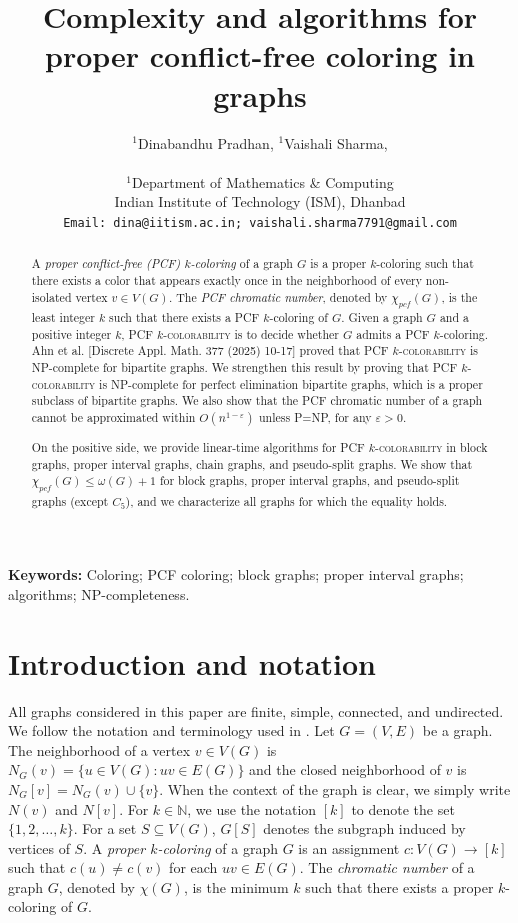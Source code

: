\documentclass[11pt]{article}
\title{Complexity and algorithms for proper conflict-free coloring in graphs}
\author{$^1$Dinabandhu Pradhan, $^1$Vaishali Sharma, \\ \\
	$^{1}$Department of Mathematics \& Computing\\ Indian Institute of Technology (ISM), Dhanbad\\
	\small \tt Email: dina@iitism.ac.in; vaishali.sharma7791@gmail.com}
\theoremstyle{plain}
\begin{document}
	
	
	\maketitle
	\begin{abstract}
		A \emph{proper conflict-free (PCF) $k$-coloring} of a graph $G$ is a proper $k$-coloring such that there exists a color that appears exactly once in the neighborhood of every non-isolated vertex $v\in V(G)$.
		The \emph{PCF chromatic number}, denoted by $\chi_{pcf}(G)$, is the least integer $k$ such that there exists a PCF $k$-coloring of $G$. Given a graph $G$ and a positive integer $k$, PCF $k$-\textsc{colorability} is to decide whether $G$ admits a PCF $k$-coloring. Ahn et al. [Discrete Appl. Math. 377 (2025) 10-17] proved that PCF $k$-\textsc{colorability} is NP-complete for bipartite graphs. We strengthen this result by proving that PCF $k$-\textsc{colorability} is NP-complete for perfect elimination bipartite graphs, which is a proper subclass of bipartite graphs. We also show that the PCF chromatic number of a graph cannot be approximated within $O(n^{1-\varepsilon})$ unless P=NP, for any $\varepsilon>0$. 
		
		\medskip
		On the positive side, we provide linear-time algorithms for PCF $k$-\textsc{colorability} in block graphs, proper interval graphs, chain graphs, and pseudo-split graphs. We show that $\chi_{pcf}(G)\leq \omega(G)+1$ for block graphs, proper interval graphs, and pseudo-split graphs (except $C_5$), and we characterize all graphs for which the equality holds.
		
	\end{abstract}
	
	\bigskip
	\noindent\textbf{Keywords:}
	Coloring; PCF coloring; block graphs; proper interval graphs;  algorithms; NP-completeness.
	
	
	
	
	
	\section{Introduction and notation}
	
	All graphs considered in this paper are finite, simple, connected, and undirected. We follow the notation and terminology used in \cite{textBook}. Let $G=(V,E)$ be a graph. The neighborhood of a vertex $v\in V(G)$ is $N_G(v)=\{u\in V(G): uv\in E(G)\}$ and the closed neighborhood of $v$ is $N_G[v]=N_G(v)\cup\{v\}$. When the context of the graph is clear, we simply write $N(v)$ and $N[v]$. For $k\in \mathbb{N}$, we use the notation $[k]$ to denote the set $\{1,2,\ldots,k\}$. For a set $S\subseteq V(G)$, $G[S]$ denotes the subgraph induced by vertices of $S$. 
	A \emph{proper $k$-coloring} of a graph $G$ is an assignment $c:V(G) \to [k]$ such that $c(u) \neq c(v)$ for each $uv \in E(G)$. The \emph{chromatic number} of a graph $G$, denoted by $\chi(G)$, is the minimum $k$ such that there exists a proper $k$-coloring of $G$.
	
\end{document}
